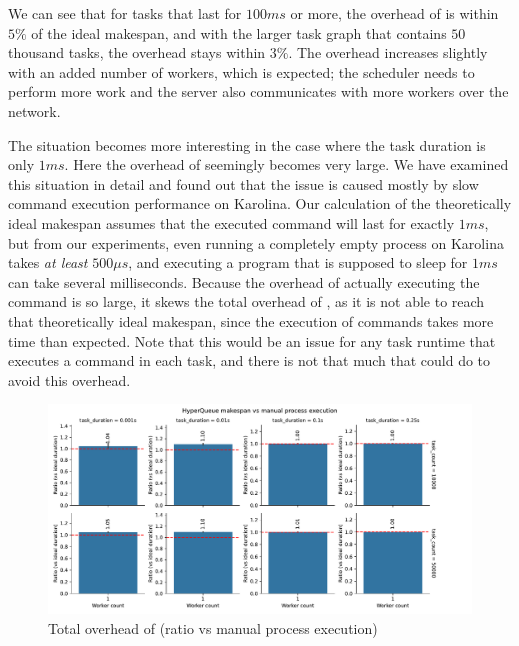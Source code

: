 We can see that for tasks that last for $100ms$ or more, the overhead of
\hyperqueue{} is within $5\%$ of the ideal makespan, and with the larger
task graph that contains $50$ thousand tasks, the overhead stays within
$3\%$. The overhead increases slightly with an added number of workers, which is
expected; the scheduler needs to perform more work and the server also communicates with more
workers over the network.

The situation becomes more interesting in the case where the task duration is only
$1ms$. Here the overhead of \hyperqueue{} seemingly becomes very large.
We have examined this situation in detail and found out that the issue is caused mostly by slow
command execution performance on Karolina. Our calculation of the theoretically ideal makespan
assumes that the executed command will last for exactly $1ms$, but from our
experiments, even running a completely empty process on Karolina takes \emph{at least}
$500\mu{}s$, and executing a program that is supposed to sleep for
$1ms$ can take several milliseconds. Because the overhead of actually executing
the command is so large, it skews the total overhead of \hyperqueue{}, as it is not able
to reach that theoretically ideal makespan, since the execution of commands takes more time than
expected. Note that this would be an issue for any task runtime that executes a command in each
task, and there is not that much that \hyperqueue{} could do to avoid this overhead.

\begin{figure}[h]
	\centering
	\includegraphics[width=\textwidth]{imgs/hq/charts/total-overhead-vs-manual}
	\caption{Total overhead of \hyperqueue{} (ratio vs manual process execution)}
	\label{fig:hq-overhead-vs-manual}
\end{figure}


